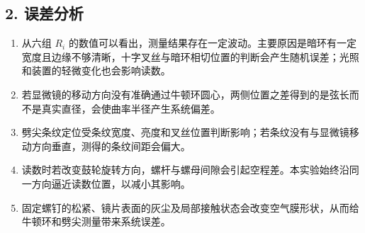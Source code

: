 \subsection*{2. 误差分析}

\begin{enumerate}[itemsep=0.2em, topsep=0.3em]
  \item 从六组 $R_i$ 的数值可以看出，测量结果存在一定波动。主要原因是暗环有一定宽度且边缘不够清晰，十字叉丝与暗环相切位置的判断会产生随机误差；光照和装置的轻微变化也会影响读数。
  \item 若显微镜的移动方向没有准确通过牛顿环圆心，两侧位置之差得到的是弦长而不是真实直径，会使曲率半径产生系统偏差。
  \item 劈尖条纹定位受条纹宽度、亮度和叉丝位置判断影响；若条纹没有与显微镜移动方向垂直，测得的条纹间距会偏大。
  \item 读数时若改变鼓轮旋转方向，螺杆与螺母间隙会引起空程差。本实验始终沿同一方向逼近读数位置，以减小其影响。
  \item 固定螺钉的松紧、镜片表面的灰尘及局部接触状态会改变空气膜形状，从而给牛顿环和劈尖测量带来系统误差。
\end{enumerate}
